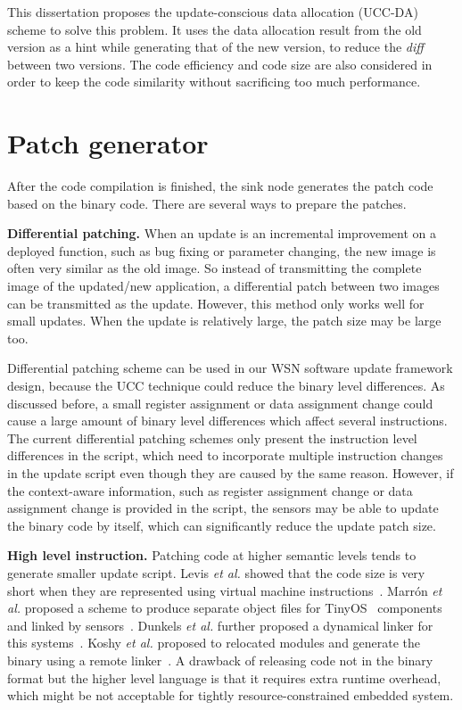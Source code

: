 This dissertation proposes the update-conscious data allocation (UCC-DA) scheme to solve this problem.
It uses the data allocation result from the old version as a hint while generating that of the new version, to reduce 
the {\it diff} between two versions.
The code efficiency and code size are also considered in order to keep the code similarity without sacrificing too much 
performance.


\section{Patch generator}

After the code compilation is finished, the sink node generates the patch code based on the binary code. There are 
several ways to prepare the patches.


\textbf{Differential patching.}
When an update is an incremental improvement on a deployed function, such as bug fixing or parameter changing, the new 
image is often very similar as the old image. So instead of transmitting the complete image of the updated/new 
application, a differential patch between two images can be transmitted as the update. 
However, this method only works well for small updates. When the update is relatively large, the patch size may be 
large too.

Differential patching scheme can be used in our WSN software update framework design, because the UCC technique could 
reduce the binary level differences. As discussed before, a small register assignment or data assignment change could 
cause a large amount of binary level differences which affect several instructions. The current differential patching 
schemes only present the instruction level differences in the script, which need to incorporate multiple instruction 
changes in the update script even though they are caused by the same reason. However, if the context-aware information, 
such as register assignment change or data assignment change is provided in the script, the sensors may be able to 
update the binary code by itself, which can significantly reduce the update patch size.

\textbf{High level instruction.}
Patching code at higher semantic levels tends to generate smaller update script. Levis \textit{et al.} showed that the 
code size is very short when they are represented using virtual machine instructions~\cite{mate}. Marr\'on \textit{et 
al.} proposed a scheme to produce separate object files for TinyOS~\cite{tinyos} components and linked by 
sensors~\cite{related:flexcup}. Dunkels \textit{et al.} further proposed a dynamical linker for this 
systems~\cite{related:dynamic1}. Koshy \textit{et al.} proposed to relocated modules and generate the binary using a 
remote linker~\cite{related:dynamic2}.
A drawback of releasing code not in the binary format but the higher level language is that it requires extra runtime 
overhead, which might be not acceptable for tightly resource-constrained embedded system.


